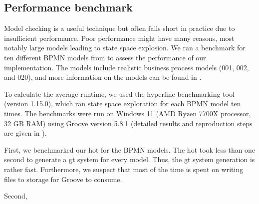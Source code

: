 \documentclass[runningheads]{llncs}
\begin{document}
\subsection{Performance benchmark}

Model checking is a useful technique but often falls short in practice due to insufficient performance.
Poor performance might have many reasons, most notably large models leading to state space explosion.
We ran a benchmark for ten different BPMN models from \cite{houhouFirstOrderLogicVerification2022} to assess the performance of our implementation.
The models include realistic business process models (001, 002, and 020), and more information on the models can be found in \cite{houhouFirstOrderLogicVerification2022}.

To calculate the average runtime, we used the hyperfine benchmarking tool \cite{peterHyperfine2022} (version 1.15.0), which ran state space exploration for each BPMN model ten times.
The benchmarks were run on Windows 11 (AMD Ryzen 7700X processor, 32 GB RAM) using Groove version 5.8.1 (detailed results and reproduction steps are given in \cite{krauterArtifactsICGT2023}). 

First, we benchmarked our \gls*{hot} for the BPMN models.
The \gls*{hot} took less than one second to generate a \gls*{gt} system for every model.
Thus, the \gls*{gt} system generation is rather fast.
Furthermore, we suspect that most of the time is spent on writing files to storage for Groove to consume.

Second,

\end{document}
